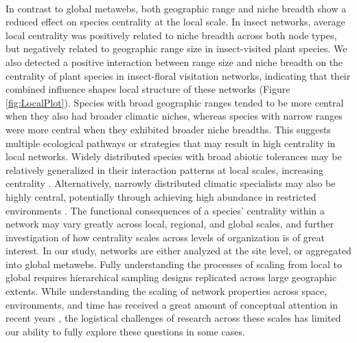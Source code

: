 \documentclass[12pt]{article}
\begin{document}
\paragraph*{}
In contrast to global metawebs, both geographic range and niche breadth show a reduced effect on species centrality at the local scale. In insect networks, average local centrality was positively related to niche breadth across both node types, but negatively related to geographic range size in insect-visited plant species. We also detected a positive interaction between range size and niche breadth on the centrality of plant species in insect-floral visitation networks, indicating that their combined influence shapes local structure of these networks (Figure \ref{fig:LocalPlot}). Species with broad geographic ranges tended to be more central when they also had broader climatic niches, whereas species with narrow ranges were more central when they exhibited broader niche breadths. This suggests multiple ecological pathways or strategies that may result in high centrality in local networks. Widely distributed species with broad abiotic tolerances may be relatively generalized in their interaction patterns at local scales, increasing centrality \citep{hurtado2024generalism}. Alternatively, narrowly distributed climatic specialists may also be highly central, potentially through achieving high abundance in restricted environments \citep{suarez2023dispersal}. The functional consequences of a species' centrality within a network may vary greatly across local, regional, and global scales, and further investigation of how centrality scales across levels of organization is of great interest. In our study, networks are either analyzed at the site level, or aggregated into global metawebs. Fully understanding the processes of scaling from local to global requires hierarchical sampling designs replicated across large geographic extents. While understanding the scaling of network properties across space, environments, and time has received a great amount of conceptual attention in recent years \citep{tylianakis2008global,morales2008effect, burkle2011future,  moulatlet2023species}, the logistical challenges of research across these scales has limited our ability to fully explore these questions in some cases. 
\end{document}
